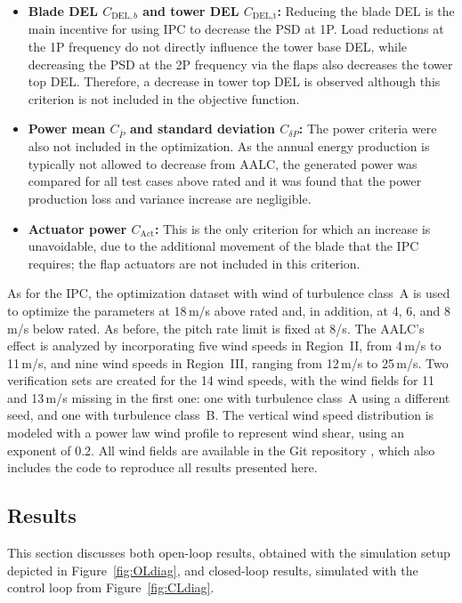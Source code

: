 \begin{itemize}
    \item \textbf{Blade DEL $C_{\text{DEL},b}$ and tower DEL $C_{\text{DEL,t}}$:} Reducing the blade DEL is the main incentive for using
    IPC to decrease the PSD at 1P. Load reductions at the 1P frequency do
    not directly influence the tower base DEL, while decreasing the PSD at the 2P frequency via the
    flaps also decreases the tower top DEL. Therefore, a decrease in tower top DEL is observed although this criterion is not included in the objective function.  
    \item \textbf{Power mean $C_{\bar{P}}$ and standard deviation $C_{\delta P}$:} The power criteria were also not included in the
    optimization. As the annual energy production is typically not allowed to decrease from AALC,
    the generated power was compared for all test cases above rated and it was found
    that the power production loss and variance increase are negligible. %
    \item \textbf{Actuator power $C_{\text{Act}}$:} This is the only criterion for which an increase is
    unavoidable, due to the additional movement of the blade that
    the IPC requires; the flap actuators are not included in this criterion. %
\end{itemize}
As for the IPC, the optimization dataset with wind of turbulence class~A is used to optimize the parameters at 18\,m/s above rated and, in addition, at 4, 6, and 8\,m/s below rated. As before, the pitch rate limit is fixed at 8\textdegree/s. The AALC's effect is analyzed by incorporating five wind speeds in Region~II, from 4\,m/s to 11\,m/s, and nine wind speeds in Region~III, ranging from 12\,m/s to 25\,m/s. Two verification sets are created for the 14 wind speeds, with the wind fields for 11 and 13\,m/s missing in the first one: one with turbulence class~A using a different seed, and one with turbulence class~B. The vertical wind speed distribution is modeled with a power law wind profile to represent wind shear, using an exponent of 0.2. All wind fields are available in the Git repository \cite{GitRepoCodeAALC}, which also includes the code to reproduce all results presented here. 

\subsection{Results} \label{subsec:ResultsTEF}
This section discusses both open-loop results, obtained with the simulation setup depicted in Figure~\ref{fig:OLdiag}, and closed-loop results, simulated with the control loop from Figure~\ref{fig:CLdiag}. 


